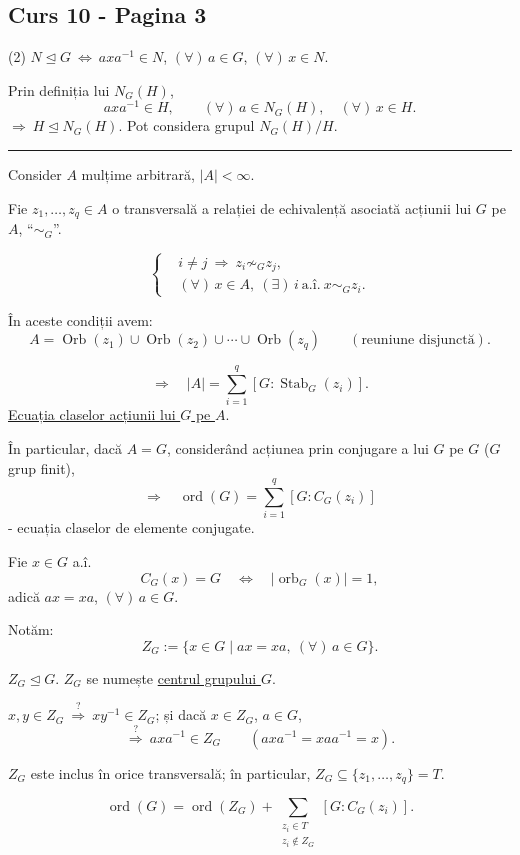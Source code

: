 
\subsection*{Curs 10 - Pagina 3}

\noindent (2) \quad
$N\trianglelefteq G\ \Longleftrightarrow\ axa^{-1}\in N$,
\quad $(\forall)\,a\in G$, $(\forall)\,x\in N$.

\medskip
\noindent Prin definiția lui $N_G(H)$,
\[
axa^{-1}\in H, \qquad
(\forall)\,a\in N_G(H),\quad (\forall)\,x\in H.
\]
\noindent $\Longrightarrow\ H\trianglelefteq N_G(H)$.
Pot considera grupul $N_G(H)/H$.

\bigskip
\hrule
\bigskip

\noindent Consider $A$ mulțime arbitrară, $|A|<\infty$.

\medskip
\noindent Fie $z_1,\ldots,z_q\in A$ o transversală a relației de echivalență
asociată acțiunii lui $G$ pe $A$, ``$\sim_G$''.

\[
\left\{\begin{aligned}
&i\neq j\ \Longrightarrow\ z_i\not\sim_G z_j,\\
&(\forall)\,x\in A,\ (\exists)\,i\ \text{a.î.}\ x\sim_G z_i.
\end{aligned}\right.
\]

\noindent În aceste condiții avem:
\[
A=\operatorname{Orb}(z_1)\cup\operatorname{Orb}(z_2)
\cup\cdots\cup\operatorname{Orb}(z_q)
\qquad (\text{reuniune disjunctă}).
\]

\[
\Longrightarrow\quad
|A|=\sum_{i=1}^{q}[G:\operatorname{Stab}_G(z_i)].
\]
\noindent \underline{Ecuația claselor acțiunii lui $G$ pe $A$}.

\bigskip
\noindent În particular, dacă $A=G$, considerând acțiunea prin conjugare
a lui $G$ pe $G$ ($G$ grup finit),
\[
\Longrightarrow\quad
\operatorname{ord}(G)=\sum_{i=1}^{q}[G:C_G(z_i)]
\]
\noindent - ecuația claselor de elemente conjugate.

\bigskip
\noindent Fie $x\in G$ a.î.
\[
C_G(x)=G\quad\Longleftrightarrow\quad
|\operatorname{orb}_G(x)|=1,
\]
\noindent adică $ax=xa$, $(\forall)\,a\in G$.

\bigskip
\noindent Notăm:
\[
Z_G:=\{x\in G\mid ax=xa,\ (\forall)\,a\in G\}.
\]

\noindent $Z_G\trianglelefteq G$.
\quad $Z_G$ se numește \underline{centrul grupului $G$}.

\medskip
\noindent $x,y\in Z_G\ \stackrel{?}{\Longrightarrow}\ xy^{-1}\in Z_G$;
\quad și dacă $x\in Z_G$, $a\in G$,
\[
\stackrel{?}{\Longrightarrow}\ axa^{-1}\in Z_G
\qquad (axa^{-1}=xaa^{-1}=x).
\]

\bigskip
\noindent $Z_G$ este inclus în orice transversală; în particular,
$Z_G\subseteq\{z_1,\ldots,z_q\}=T$.

\[
\operatorname{ord}(G)=\operatorname{ord}(Z_G)
+\sum_{\substack{z_i\in T\\z_i\notin Z_G}}[G:C_G(z_i)].
\]

